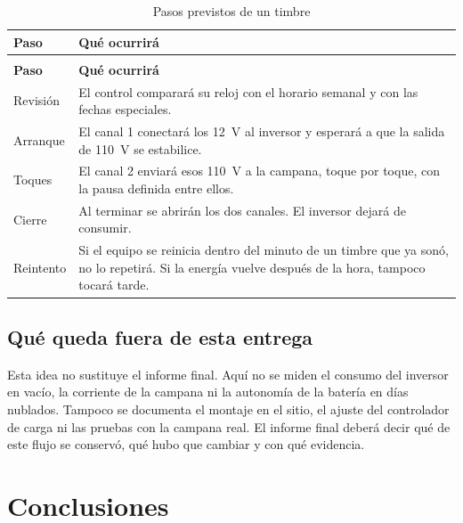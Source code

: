 \documentclass[12pt,letterpaper]{article}
\begin{document}
\begin{longtable}{>{\raggedright\arraybackslash}p{} >{\raggedright\arraybackslash}p{}}
\caption{Pasos previstos de un timbre}\label{tab:secuencia}\\
\toprule
\textbf{Paso} & \textbf{Qué ocurrirá} \\
\midrule
\endfirsthead
\multicolumn{2}{l}{\small\textit{Continuación de la Tabla \ref{tab:secuencia}}}\\
\toprule
\textbf{Paso} & \textbf{Qué ocurrirá} \\
\midrule
\endhead
\bottomrule
\endfoot
Revisión & El control comparará su reloj con el horario semanal y con las fechas especiales. \\
\addlinespace
Arranque & El canal 1 conectará los 12~V al inversor y esperará a que la salida de 110~V se estabilice. \\
\addlinespace
Toques & El canal 2 enviará esos 110~V a la campana, toque por toque, con la pausa definida entre ellos. \\
\addlinespace
Cierre & Al terminar se abrirán los dos canales. El inversor dejará de consumir. \\
\addlinespace
Reintento & Si el equipo se reinicia dentro del minuto de un timbre que ya sonó, no lo repetirá. Si la energía vuelve después de la hora, tampoco tocará tarde. \\
\end{longtable}

\subsection*{Qué queda fuera de esta entrega}

Esta idea no sustituye el informe final. Aquí no se miden el consumo del inversor en vacío, la corriente de la campana ni la autonomía de la batería en días nublados. Tampoco se documenta el montaje en el sitio, el ajuste del controlador de carga ni las pruebas con la campana real. El informe final deberá decir qué de este flujo se conservó, qué hubo que cambiar y con qué evidencia.

\section*{Conclusiones}
\end{document}
